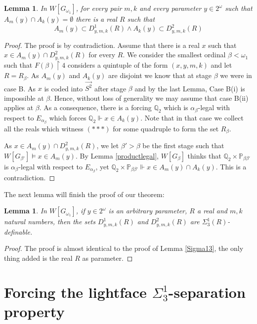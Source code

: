\documentclass[a4paper,11pt]{article}
\newtheorem{lemma}[theorem]{Lemma}
\newcommand{\forceP}{\mathbb{P}}
\newcommand{\forceQ}{\mathbb{Q}}
\begin{document}
\begin{lemma}
In $W[G_{\omega_1}]$, for every pair $m,k$ and every parameter $y \in 2^{\omega}$ such that $A_m(y) \cap A_k(y) = \emptyset$ there is a real $R$ such that 
\[ A_m(y) \subset D^1_{y,m,k}(R) \land A_k(y) \subset D^2_{y,m,k}(R)\]
\end{lemma}
\begin{proof}
The proof is by contradiction. Assume that there is a real $x$ such that $x \in A_m(y) \cap D^2_{y,m,k}(R)$ for every $R$.
We consider the smallest ordinal $\beta < \omega_1$ such that  $F(\beta)\upharpoonright 4$ considers a quintuple of the form $(x,y,m,k)$ and let $R= R_{\beta}$. As $A_m(y)$ and $A_k(y)$ are disjoint we know that at stage $\beta$ we were in case B. 
As $x$ is coded into $\vec{S^2}$ after stage $\beta$ and by the last Lemma, Case B(i) is impossible at $\beta$. Hence, without loss of generality we may assume that case B(ii) applies at $\beta$. As a consequence, there is a forcing $\forceQ_2$ which is $\alpha_{\beta}$-legal with respect to $E_{\alpha_{\beta}}$ which forces $\forceQ_2 \Vdash x \in A_k(y)$. Note that in that case we collect all the reals which witness $( {\ast} {\ast} {\ast})$ for some quadruple to form the set $R_{\beta}$. 

As $x \in A_m(y) \cap  D^2_{y,m,k} (R)$, we let $\beta'> \beta$ be the first stage such that $W[G_{\beta'}] \models x \in A_m(y)$. By Lemma \ref{productlegal}, $W[G_{\beta}]$ thinks that $\forceQ_2 \times \forceP_{\beta \beta'}$ is $\alpha_{\beta}$-legal with respect to $E_{\alpha_{\beta}}$, yet 
$\forceQ_2 \times \forceP_{\beta \beta'} \Vdash x \in A_m(y) \cap A_k(y)$. This is a contradiction.
\end{proof}

The next lemma will finish the proof of our theorem:
\begin{lemma}
In $W[G_{\omega_1}]$, if $y \in 2^{\omega}$ is an arbitrary  parameter, $R$ a real and $m,k$ natural numbers, then the sets $D^1_{y,m,k}(R)$ and $D^2_{y,m,k}(R)$ are $\Sigma^1_3(R)$-definable.
\end{lemma}
\begin{proof}
The proof is almost identical to the proof of Lemma \ref{Sigma13}, the only thing added is the real $R$ as parameter.
\end{proof}


\section{Forcing the lightface $\Sigma^1_3$-separation property}
\end{document}
